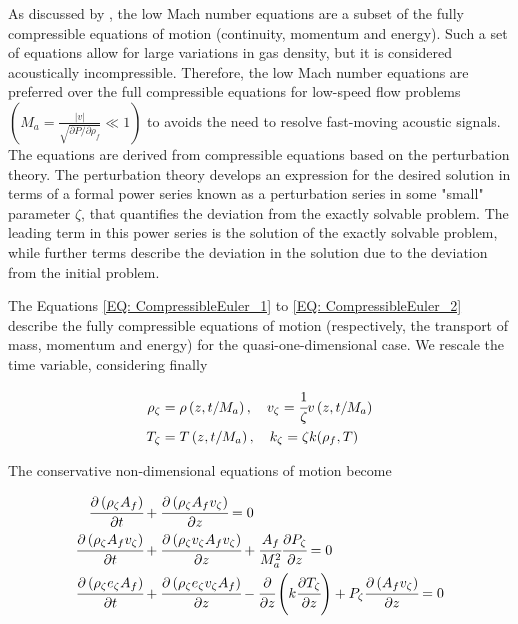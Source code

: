 \documentclass[../Article_Model_Parameters.tex]{subfiles}
\begin{document}
	
	As discussed by \citet{Lions2013}, the low Mach number equations are a subset of the fully compressible equations of motion (continuity, momentum and energy). Such a set of equations allow for large variations in gas density, but it is considered acoustically incompressible. Therefore, the low Mach number equations are preferred over the full compressible equations for low-speed flow problems $\left( M_a = \frac{|v|}{\sqrt{ \partial P / \partial \rho_f }} \ll 1 \right)$ to avoids the need to resolve fast-moving acoustic signals. The equations are derived from compressible equations based on the perturbation theory. The perturbation theory develops an expression for the desired solution in terms of a formal power series known as a perturbation series in some "small" parameter $\zeta$, that quantifies the deviation from the exactly solvable problem. The leading term in this power series is the solution of the exactly solvable problem, while further terms describe the deviation in the solution due to the deviation from the initial problem. 
	
	The Equations \ref{EQ: CompressibleEuler_1} to \ref{EQ: CompressibleEuler_2} describe the fully compressible equations of motion (respectively, the transport of mass, momentum and energy) for the quasi-one-dimensional case. We rescale the time variable, considering finally 
	
	{\footnotesize
		\begin{align*}
			\rho_\zeta 	&= \rho\left( z, t/M_a \right), \quad
			v_\zeta 	= \cfrac{1}{\zeta} v\left( z, t/M_a \right) \\ 
			T_\zeta 	&= T\left( z, t/M_a \right),  \quad 
			k_\zeta 	= \zeta k(\rho_f, T) 
		\end{align*} 
	}
	
	The conservative non-dimensional equations of motion become
	
	{\footnotesize
		\begin{align*}
			\cfrac{\partial \left( \rho_\zeta A_f \right)}{\partial t} &+ \cfrac{\partial \left( \rho_\zeta A_f v_\zeta \right)}{\partial z} = 0 \\
			\cfrac{\partial \left( \rho_\zeta A_f v_\zeta \right) }{\partial t}	&+ \cfrac{\partial \left( \rho_\zeta v_\zeta A_f v_\zeta \right)}{\partial z} + \cfrac{A_f}{M_a^2} \cfrac{\partial P_\zeta}{\partial z} = 0\\
			\cfrac{\partial \left( \rho_\zeta e_\zeta A_f \right) }{\partial t} &+ \cfrac{\partial \left( \rho_\zeta e_\zeta v_\zeta A_f \right)}{\partial z} - \cfrac{\partial}{\partial z} \left( k \cfrac{\partial T_\zeta}{\partial z} \right) + P_\zeta \cfrac{\partial \left(A_f v_\zeta\right)}{\partial z} = 0
		\end{align*}
	}
	
\end{document}
